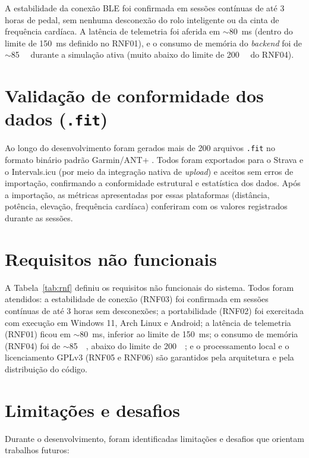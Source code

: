 A estabilidade da conexão BLE foi confirmada em sessões contínuas de até 3
horas de pedal, sem nenhuma desconexão do rolo inteligente ou da cinta de
frequência cardíaca. A latência de telemetria foi aferida em
$\sim$\SI{80}{\milli\second} (dentro do limite de \SI{150}{\milli\second}
definido no RNF01), e o consumo de memória do \textit{backend} foi de
$\sim$\SI{85}{\mega\byte} durante a simulação ativa (muito abaixo do limite
de \SI{200}{\mega\byte} do RNF04).

\section{Validação de conformidade dos dados (\texttt{.fit})}
\label{sec:validacao-conformidade}

Ao longo do desenvolvimento foram gerados mais de 200 arquivos \texttt{.fit}
no formato binário padrão Garmin/ANT+ \cite{garmin2024}. Todos foram exportados
para o Strava e o Intervals.icu (por meio da integração nativa de
\textit{upload}) e aceitos sem erros de importação, confirmando a
conformidade estrutural e estatística dos dados. Após a importação, as métricas
apresentadas por essas plataformas (distância, potência, elevação, frequência
cardíaca) conferiram com os valores registrados durante as sessões.

\section{Requisitos não funcionais}
\label{sec:rnf-atendidos}

A Tabela~\ref{tab:rnf} definiu os requisitos não funcionais do sistema. Todos
foram atendidos: a estabilidade de conexão (RNF03) foi confirmada em sessões
contínuas de até 3 horas sem desconexões; a portabilidade (RNF02) foi
exercitada com execução em Windows 11, Arch Linux e Android; a latência de
telemetria (RNF01) ficou em $\sim$\SI{80}{\milli\second}, inferior ao limite
de \SI{150}{\milli\second}; o consumo de memória (RNF04) foi de
$\sim$\SI{85}{\mega\byte}, abaixo do limite de \SI{200}{\mega\byte}; e o
processamento local e o licenciamento GPLv3 (RNF05 e RNF06) são garantidos
pela arquitetura e pela distribuição do código.

\section{Limitações e desafios}
\label{sec:limitacoes}

Durante o desenvolvimento, foram identificadas limitações e desafios que
orientam trabalhos futuros:


